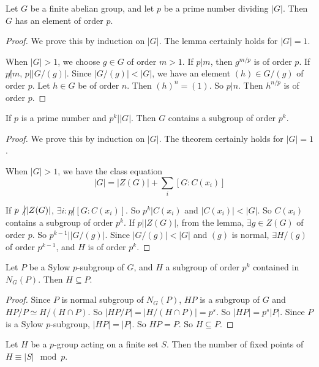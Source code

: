 \documentclass[12pt]{book}
\begin{document}
	\begin{lemma}
		Let $G$ be a finite abelian group, and let $p$ be a prime number dividing $|G|$. Then $G$ has an element of order $p$.
	\end{lemma}
	\begin{proof}
		We prove this by induction on $|G|$. The lemma certainly holds for $|G|=1$.
		
		When $|G|>1$, we choose $g\in G$ of order $m>1$. If $p|m$, then $g^{m/p}$ is of order $p$. If $p\not| m$, $p\big ||G/(g)|$. Since $|G/(g)|<|G|$, we have an element $(h)\in G/(g)$ of order $p$. Let $h\in G$ be of order $n$. Then $(h)^n=(1)$. So $p|n$. Then $h^{n/p}$ is of order $p$.
	\end{proof}
	
	\begin{theorem}[Sylow I]
		If $p$ is a prime number and $p^k\big||G|$. Then $G$ contains a subgroup of order $p^k$.
	\end{theorem}
	\begin{proof}
		We prove this by induction on $|G|$. The theorem certainly holds for $|G|=1$.
		
		When $|G|>1$, we have the class equation
		\begin{equation}
			|G|=|Z(G)|+\sum_i[G:C(x_i)]
		\end{equation}
		
		If $p\not\big||Z(G)|$, $\exists i:p\not|[G:C(x_i)]$. So $p^k|C(x_i)$ and $|C(x_i)|<|G|$. So $C(x_i)$ contains a subgroup of order $p^k$. If $p\big||Z(G)|$, from the lemma, $\exists g\in Z(G)$ of order $p$. So $p^{k-1}\big||G/(g)|$. Since $|G/(g)|<|G|$ and $(g)$ is normal, $\exists H/(g)$ of order $p^{k-1}$, and $H$ is of order $p^k$.
	\end{proof}
	
	\begin{lemma}
		Let $P$ be a Sylow $p$-subgroup of $G$, and $H$ a subgroup of order $p^k$ contained in $N_G(P)$. Then $H\subseteq P$.
		\label{lem:sylow_pgroup}
	\end{lemma}
	\begin{proof}
		Since $P$ is normal subgroup of $N_G(P)$, $HP$ is a subgroup of $G$ and $HP/P\simeq H/(H\cap P)$. So $|HP/P|=|H/(H\cap P)|=p^s$. So $|HP|=p^s|P|$. Since $P$ is a Sylow $p$-subgroup, $|HP|=|P|$. So $HP=P$. So $H\subseteq P$.
	\end{proof}
	
	\begin{lemma}
		Let $H$ be a $p$-group acting on a finite set $S$. Then the number of fixed points of $H\equiv |S| \mod p$.
		\label{lem:sylow_mod1}
	\end{lemma}
	
\end{document}
